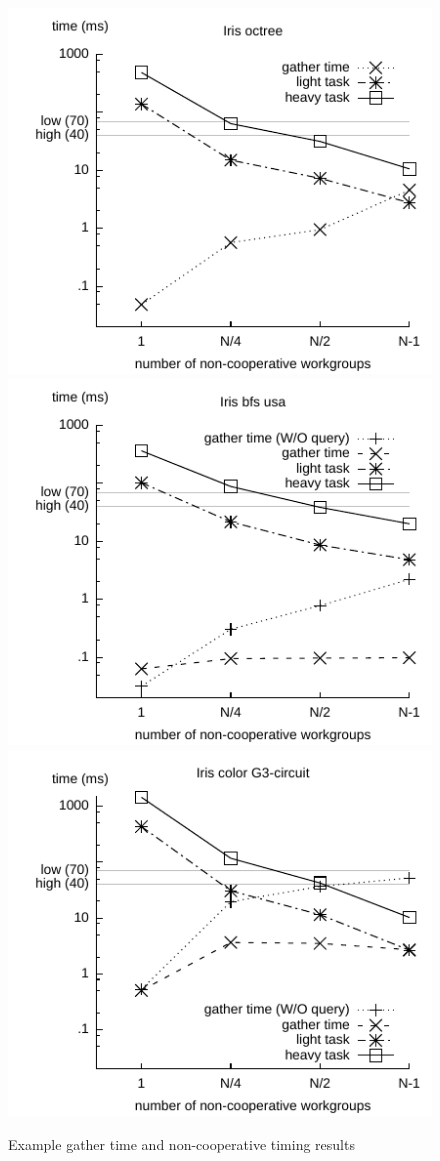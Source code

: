 \documentclass[sigconf]{acmart}
\begin{document}
{\begin{figure}
\includegraphics[width=.67\columnwidth]{iris_octree_NA.pdf}
\includegraphics[width=.67\columnwidth]{iris_bfs_usa.pdf}
\includegraphics[width=.67\columnwidth]{iris_color_G3_circuit.pdf}
\caption{Example gather time and non-cooperative timing results}\label{fig:fine-grained-timing}
\end{figure}


}
\end{document}
